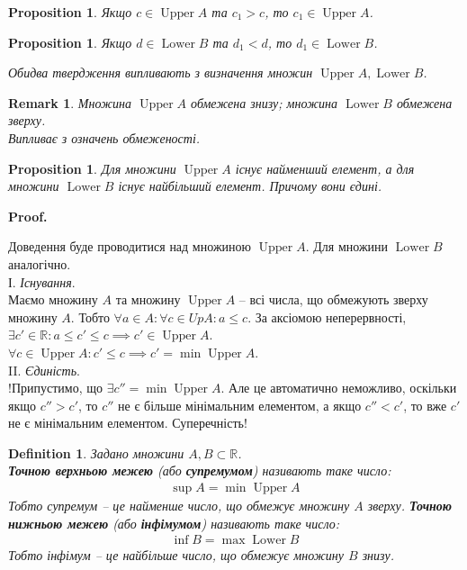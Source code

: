\documentclass[a4paper, 14pt]{article}
\makeatletter
\def\qed{$\blacksquare$}
\theoremstyle{theoremdd}
\theoremstyle{theoremdd}
\newtheorem{definition}[theorem]{Definition}
\theoremstyle{theoremdd}
\theoremstyle{theoremdd}
\theoremstyle{theoremdd}
\newtheorem{proposition}[theorem]{Proposition}
\theoremstyle{theoremdd}
\newtheorem{remark}[theorem]{Remark}
\theoremstyle{theoremdd}
\theoremstyle{theoremdd}
\renewenvironment{proof}[1][Proof.\\]{\par
\pushQED{\hfill \qed}%
\normalfont \topsep6\p@\@plus6\p@\relax
\trivlist
\item\relax
{\bfseries
#1\@addpunct{.}}\hspace\labelsep\ignorespaces
}{%
\popQED\endtrivlist\@endpefalse
}
\DeclareMathOperator{\Up}{Upper}
\DeclareMathOperator{\Low}{Lower}
\makeatother
\begin{document}
	\begin{proposition}
	Якщо $c \in \Up A$ та $c_1 > c$, то $c_1 \in \Up A$.
	\end{proposition}
	
	\begin{proposition}
	Якщо $d \in \Low B$ та $d_1 < d$, то $d_1 \in \Low B$.
	\end{proposition}
	
	\textit{Обидва твердження випливають з визначення множин $\Up A, \Low B$.}
	
	\begin{remark}
	Множина $\Up A$ обмежена знизу; множина $\Low B$ обмежена зверху.\\
	\textit{Випливає з означень обмеженості.}
	\end{remark}
	
	\begin{proposition}
	Для множини $\Up A$ існує найменший елемент, а для множини $\Low B$ існує найбільший елемент. Причому вони єдині.
	\end{proposition}
	
	\begin{proof}
	Доведення буде проводитися над множиною $\Up A$. Для множини $\Low B$ аналогічно.\\
	І. \textit{Існування}.\\
	Маємо множину $A$ та множину $\Up A$ -- всі числа, що обмежують зверху множину $A$. Тобто $\forall a \in A: \forall c \in UpA: a \leq c$. За аксіомою неперервності, $\exists c' \in \mathbb{R}: a \leq c' \leq c \implies c' \in \Up A$.\\
	$\forall c \in \Up A: c' \leq c \implies c' = \min \Up A$.
	\bigskip \\
	II. \textit{Єдиність}.\\
	!Припустимо, що $\exists c'' = \min \Up A$. Але це автоматично неможливо, оскільки якщо $c'' > c'$, то $c''$ не є більше мінімальним елементом, а якщо $c'' < c'$, то вже $c'$ не є мінімальним елементом. Суперечність!
	\end{proof}
	
	\begin{definition} Задано множини $A,B \subset \mathbb{R}$.\\
	\textbf{Точною верхньою межею} (або \textbf{супремумом}) називають таке число:
	\begin{align*}
	\sup A = \min \Up A
	\end{align*}
	Тобто супремум -- це найменше число, що обмежує множину $A$ зверху.
	\textbf{Точною нижньою межею} (або \textbf{інфімумом}) називають таке число:
	\begin{align*}
	\inf B = \max \Low B
	\end{align*}
	Тобто інфімум -- це найбільше число, що обмежує множину $B$ знизу.
	\end{definition}
	
\end{document}
